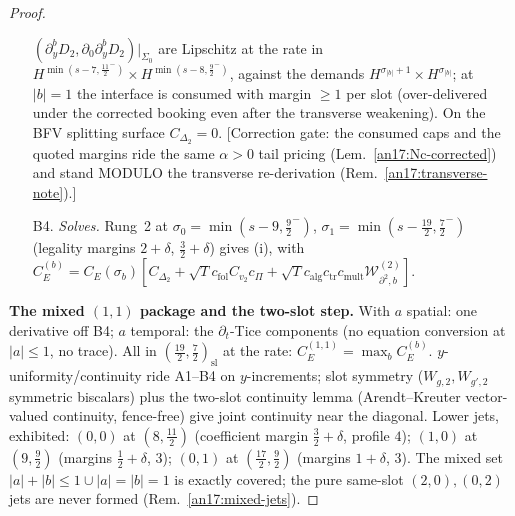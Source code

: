 \begin{proof}
\begin{itemize}
  $(\partial_y^bD_2,\partial_0\partial_y^bD_2)|_{\Sigma_0}$ are Lipschitz at the
  rate in $H^{\min(s-7,\frac{11}2^-)}\times H^{\min(s-8,\frac92^-)}$, against
  the demands $H^{\sigma_{|b|}+1}\times H^{\sigma_{|b|}}$; at $|b|=1$ the
  interface is consumed with margin $\ge1$ per slot (over-delivered under the
  corrected booking even after the transverse weakening). On the BFV splitting
  surface $C_{\Delta_2}=0$. \textup{[Correction gate: the consumed caps and the
  quoted margins ride the same $\alpha>0$ tail pricing
  (Lem.~\ref{an17:Nc-corrected}) and stand MODULO the transverse
  re-derivation (Rem.~\ref{an17:transverse-note}).]}
\item[B4.] \emph{Solves.} Rung~2 at $\sigma_0=\min(s-9,\tfrac92^-)$,
  $\sigma_1=\min(s-\tfrac{19}2,\tfrac72^-)$ (legality margins $2+\delta$,
  $\tfrac32+\delta$) gives (i), with
  $C^{(b)}_E=C_E(\sigma_b)[C_{\Delta_2}+\sqrt T c_{\mathrm{fol}}C_{v_2}c_\Pi
  +\sqrt T c_{\mathrm{alg}}c_{\mathrm{tr}}c_{\mathrm{mult}}
  \mathcal W^{(2)}_{\partial^2,b}]$.
\end{itemize}

\medskip\noindent
\textbf{The mixed $(1,1)$ package and the two-slot step.} With $a$ spatial: one
derivative off B4; $a$ temporal: the $\partial_t$-Tice components (no equation
conversion at $|a|\le1$, no trace). All in $(\tfrac{19}2,\tfrac72)_{\mathrm{sl}}$
at the rate: $C^{(1,1)}_E=\max_bC^{(b)}_E$. $y$-uniformity/continuity ride
A1--B4 on $y$-increments; slot symmetry ($W_{g,2},W_{g',2}$ symmetric
biscalars) plus the two-slot continuity lemma (Arendt--Kreuter
vector-valued continuity, fence-free) give joint continuity near the diagonal.
Lower jets, exhibited: $(0,0)$ at $(8,\tfrac{11}2)$ (coefficient margin
$\tfrac32+\delta$, profile $4$); $(1,0)$ at $(9,\tfrac92)$ (margins
$\tfrac12+\delta$, $3$); $(0,1)$ at $(\tfrac{17}2,\tfrac92)$ (margins
$1+\delta$, $3$). The mixed set $|a|+|b|\le1\cup|a|=|b|=1$ is exactly covered;
the pure same-slot $(2,0),(0,2)$ jets are never formed
(Rem.~\ref{an17:mixed-jets}).


\end{proof}
